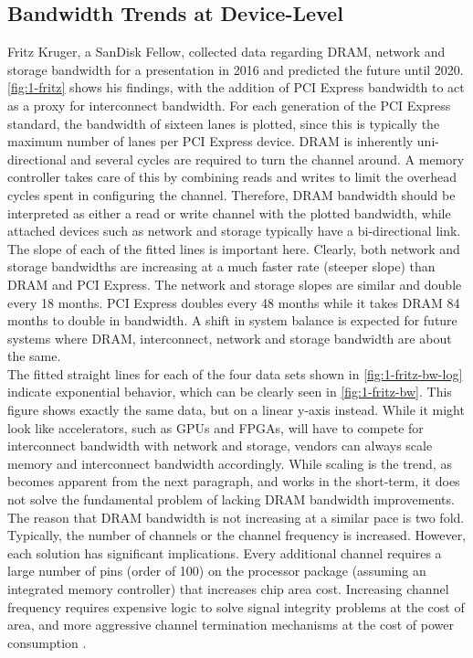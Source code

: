\subsection{Bandwidth Trends at Device-Level}

Fritz Kruger, a SanDisk Fellow, collected data regarding DRAM, network and storage bandwidth for a presentation in 2016 and predicted the future until 2020. \autoref{fig:1-fritz} shows his findings, with the addition of PCI Express bandwidth to act as a proxy for interconnect bandwidth. For each generation of the PCI Express standard, the bandwidth of sixteen lanes is plotted, since this is typically the maximum number of lanes per PCI Express device. DRAM is inherently uni-directional and several cycles are required to turn the channel around. A memory controller takes care of this by combining reads and writes to limit the overhead cycles spent in configuring the channel. Therefore, DRAM bandwidth should be interpreted as either a read or write channel with the plotted bandwidth, while attached devices such as network and storage typically have a bi-directional link.\\
The slope of each of the fitted lines is important here. Clearly, both network and storage bandwidths are increasing at a much faster rate (steeper slope) than DRAM and PCI Express. The network and storage slopes are similar and double every 18 months. PCI Express doubles every 48 months while it takes DRAM 84 months to double in bandwidth. A shift in system balance is expected for future systems where DRAM, interconnect, network and storage bandwidth are about the same.\\
The fitted straight lines for each of the four data sets shown in \autoref{fig:1-fritz-bw-log} indicate exponential behavior, which can be clearly seen in \autoref{fig:1-fritz-bw}. This figure shows exactly the same data, but on a linear y-axis instead. While it might look like accelerators, such as GPUs and FPGAs, will have to compete for interconnect bandwidth with network and storage, vendors can always scale memory and interconnect bandwidth accordingly. While scaling is the trend, as becomes apparent from the next paragraph, and works in the short-term, it does not solve the fundamental problem of lacking DRAM bandwidth improvements.\\
The reason that DRAM bandwidth is not increasing at a similar pace is two fold. Typically, the number of channels or the channel frequency is increased. However, each solution has significant implications. Every additional channel requires a large number of pins (order of 100) on the processor package (assuming an integrated memory controller) that increases chip area cost. Increasing channel frequency requires expensive logic to solve signal integrity problems at the cost of area, and more aggressive channel termination mechanisms at the cost of power consumption \cite{dram-1, dram-2}.

